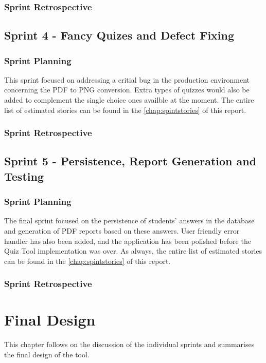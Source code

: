 \subsection{Sprint Retrospective}


\section{Sprint 4 - Fancy Quizes and Defect Fixing}
\subsection{Sprint Planning}
This sprint focused on addressing a critial bug in the production environment
concerning the PDF to PNG conversion. Extra types of quizzes would also be added
to complement the single choice ones availble at the moment. The entire list of estimated stories
can be found in the \autoref{chap:spintstories} of this report.

\subsection{Sprint Retrospective}
\section{Sprint 5 - Persistence, Report Generation and Testing}
\subsection{Sprint Planning}
The final sprint focused on the persistence of students' answers in the database and
generation of PDF reports based on these answers. User friendly error handler has
also been added, and the application has been polished before the Quiz Tool implementation
was over. As always, the entire list of estimated stories
can be found in the \autoref{chap:spintstories} of this report.

\subsection{Sprint Retrospective}

\chapter{Final Design}

This chapter follows on the discussion of the individual sprints and summarises
the final design of the tool.


